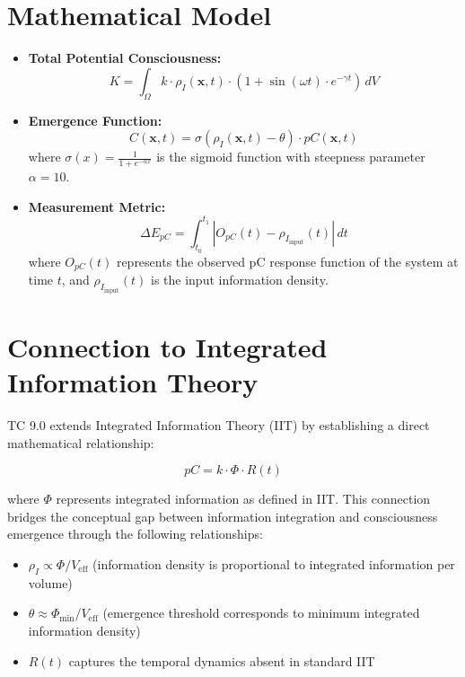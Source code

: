 \documentclass[12pt]{article}
\begin{document}
\section{Mathematical Model}
\begin{itemize}
    \item \textbf{Total Potential Consciousness:} 
    \begin{equation}
    K = \int_{\Omega} k \cdot \rho_I(\mathbf{x}, t) \cdot \left(1 + \sin(\omega t) \cdot e^{-\gamma t}\right) \, dV
    \end{equation}
    
    \item \textbf{Emergence Function:} 
    \begin{equation}
    C(\mathbf{x}, t) = \sigma(\rho_I(\mathbf{x}, t) - \theta) \cdot pC(\mathbf{x}, t)
    \end{equation}
    where $\sigma(x) = \frac{1}{1 + e^{-\alpha x}}$ is the sigmoid function with steepness parameter $\alpha = 10$.
    
    \item \textbf{Measurement Metric:} 
    \begin{equation}
    \Delta E_{pC} = \int_{t_0}^{t_1} |O_{pC}(t) - \rho_{I_{\text{input}}}(t)| \, dt
    \end{equation}
    where $O_{pC}(t)$ represents the observed pC response function of the system at time $t$, and $\rho_{I_{\text{input}}}(t)$ is the input information density.
\end{itemize}

\section{Connection to Integrated Information Theory}
TC 9.0 extends Integrated Information Theory (IIT) \cite{tononi2008} by establishing a direct mathematical relationship:

\begin{equation}
pC = k \cdot \Phi \cdot R(t)
\end{equation}

where $\Phi$ represents integrated information as defined in IIT. This connection bridges the conceptual gap between information integration and consciousness emergence through the following relationships:

\begin{itemize}
    \item $\rho_I \propto \Phi / V_{\text{eff}}$ (information density is proportional to integrated information per volume)
    \item $\theta \approx \Phi_{\text{min}} / V_{\text{eff}}$ (emergence threshold corresponds to minimum integrated information density)
    \item $R(t)$ captures the temporal dynamics absent in standard IIT
\end{itemize}
\end{document}
